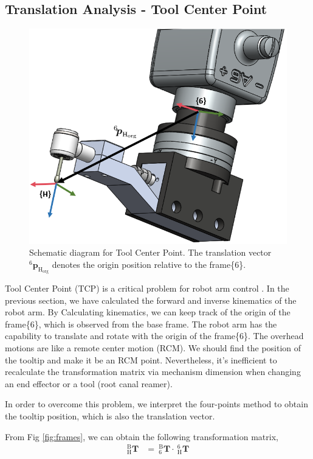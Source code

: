 \subsection{Translation Analysis - Tool Center Point}
\label{sec:tcp}
\begin{figure}[htbp]
\begin{center}
\includegraphics[width=0.7\linewidth]{Images/TCP.png}
\caption{
Schematic diagram for Tool Center Point. The translation vector $^\mathrm{6}\!\boldsymbol{p}_\mathrm{H_{org}}$ denotes the origin position relative to the frame\{6\}.
}\label{fig:tcp}
\end{center}
\end{figure}
\hspace*{6mm}Tool Center Point (TCP) is a critical problem for robot arm control \cite{yang2017four}. In the previous section, we have calculated the forward and inverse kinematics of the robot arm. By Calculating kinematics, we can keep track of the origin of the frame\{6\}, which is observed from the base frame. The robot arm has the capability to translate and rotate with the origin of the frame\{6\}. The overhead motions are like a remote center motion (RCM). We should find the position of the tooltip and make it be an RCM point. Nevertheless, it's inefficient to recalculate the transformation matrix via mechanism dimension when changing an end effector or a tool (root canal reamer).
\par
In order to overcome this problem, we interpret the four-points method to obtain the tooltip position, which is also the translation vector.
\par\noindent
From Fig \ref{fig:frames}, we can obtain the following transformation matrix,
\begin{equation}
\begin{split}
_{\mathrm{H}}^{\mathrm{B}}\mathbf{T} &=\ _{\mathrm{6}}^{\mathrm{B}}\mathbf{T}\cdot \ _{\mathrm{H}}^{\mathrm{6}}\mathbf{T}\\
\end{split}
\end{equation}		
